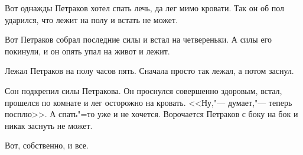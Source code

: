 Вот однажды Петраков хотел спать лечь, да лег мимо кровати. Так он об пол ударился, что лежит на полу и встать не может.

Вот Петраков собрал последние силы и встал на четвереньки. А силы его покинули, и он опять упал на живот и лежит.

Лежал Петраков на полу часов пять. Сначала просто так лежал, а потом заснул.

Сон подкрепил силы Петракова. Он проснулся совершенно здоровым, встал, прошелся по комнате и лег осторожно на кровать. <<Ну,"--- думает,"--- теперь посплю>>. А спать"=то уже и не хочется. Ворочается Петраков с боку на
бок и никак заснуть не может.

Вот, собственно, и все.